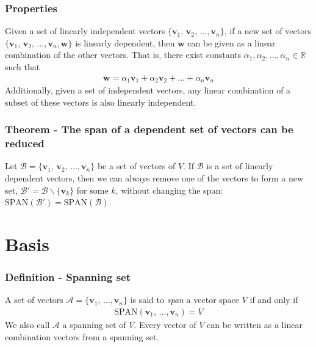 \documentclass[usenames,dvipsnames,aspectratio=169,10pt]{beamer}
\numberwithin{equation}{section}
\begin{document}
\begin{frame}
\frametitle{Properties}

Given a set of linearly independent vectors $\{ \mathbf{v}_1, \, \mathbf{v}_2, \, \dots, \mathbf{v}_n \}$, if a new set of vectors $\{ \mathbf{v}_1, \, \mathbf{v}_2, \, \dots, \mathbf{v}_n, \mathbf{w} \}$ is linearly dependent, then $\mathbf{w}$ can be given as a linear combination of the other vectors. That is, there exist constants $\alpha_1, \alpha_2, \dots, \alpha_n \in \mathbb{R}$ such that
\begin{align*}
\mathbf{w} = \alpha_1\mathbf{v}_1 + \alpha_2 \mathbf{v}_2 + \dots + \alpha_n \mathbf{v}_n
\end{align*}
Additionally, given a set of independent vectors, any linear combination of a subset of these vectors is also linearly independent.

\end{frame}



\begin{frame}
\frametitle{Theorem - The span of a dependent set of vectors can be reduced}


Let $\mathcal{B}=\{\mathbf{v}_1, \, \mathbf{v}_2, \, \dots, \mathbf{v}_n\}$ be a set of vectors of $V$. If $\mathcal{B}$ is a set of linearly dependent vectors, then we can always remove one of the vectors to form a new set, $\mathcal{B}'=\mathcal{B} \backslash \{\mathbf{v}_k\}$ for some $k$, without changing the span: $\text{SPAN}(\mathcal{B}')=\text{SPAN}(\mathcal{B})$.
\end{frame}



\section{Basis}



\begin{frame}
\frametitle{Definition - Spanning set}

A set of vectors $\mathcal{A} = \{ \mathbf{v}_1, \, \dots, \mathbf{v}_n \}$ is said to \textit{span} a vector space $V$ if and only if
\begin{align*}
\text{SPAN}(\mathbf{v}_1, \, \dots, \mathbf{v}_n ) = V
\end{align*}
We also call $\mathcal{A}$ a spanning set of $V$. Every vector of $V$ can be written as a linear combination vectors from a spanning set.

\end{frame}
\end{document}
